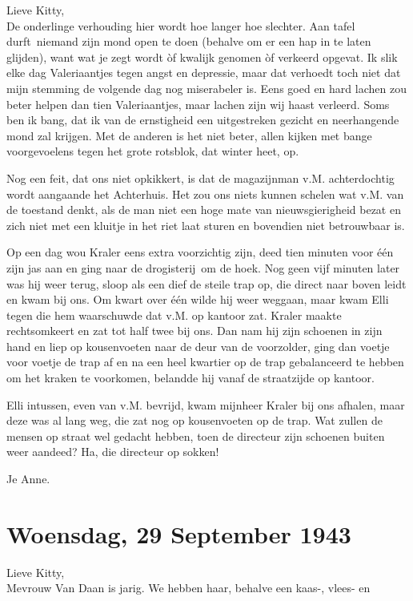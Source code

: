 \documentclass{book}
\begin{document}
Lieve Kitty,\\De onderlinge verhouding hier wordt hoe langer hoe
slechter. Aan tafel durft~niemand zijn mond open te doen (behalve om er
een hap in te laten glijden), want wat je zegt wordt òf kwalijk genomen
òf verkeerd opgevat. Ik slik elke dag Valeriaantjes tegen angst en
depressie, maar dat verhoedt toch niet dat mijn stemming de volgende dag
nog miserabeler is. Eens goed en hard lachen zou beter helpen dan tien
Valeriaantjes, maar lachen zijn wij haast verleerd. Soms ben ik bang,
dat ik van de ernstigheid een uitgestreken gezicht en neerhangende mond
zal krijgen. Met de anderen is het niet beter, allen kijken met bange
voorgevoelens tegen het grote rotsblok, dat winter heet, op.

Nog een feit, dat ons niet opkikkert, is dat de magazijnman v.M.
achterdochtig wordt aangaande het Achterhuis. Het zou ons niets kunnen
schelen wat v.M. van de toestand denkt, als de man niet een hoge mate
van nieuwsgierigheid bezat en zich niet met een kluitje in het riet laat
sturen en bovendien niet betrouwbaar is.

Op een dag wou Kraler eens extra voorzichtig zijn, deed tien minuten
voor één zijn jas aan en ging naar de drogisterij~om de hoek. Nog geen
vijf minuten later was hij weer terug, sloop als een dief de steile trap
op, die direct naar boven leidt en kwam bij ons. Om kwart over één wilde
hij weer weggaan, maar kwam Elli tegen die hem waarschuwde dat v.M. op
kantoor zat. Kraler maakte rechtsomkeert en zat tot half twee bij ons.
Dan nam hij zijn schoenen in zijn hand en liep op kousenvoeten naar de
deur van de voorzolder, ging dan voetje voor voetje de trap af en na een
heel kwartier op de trap gebalanceerd te hebben om het kraken te
voorkomen, belandde hij vanaf de straatzijde op kantoor.

Elli intussen, even van v.M. bevrijd, kwam mijnheer Kraler bij ons
afhalen, maar deze was al lang weg, die zat nog op kousenvoeten op de
trap. Wat zullen de mensen op straat wel gedacht hebben, toen de
directeur zijn schoenen buiten weer aandeed? Ha, die directeur op
sokken!

Je Anne.

\chapter{Woensdag, 29 September 1943}

Lieve Kitty,\\Mevrouw Van Daan is jarig. We hebben haar, behalve een
kaas-, vlees- en
\end{document}

